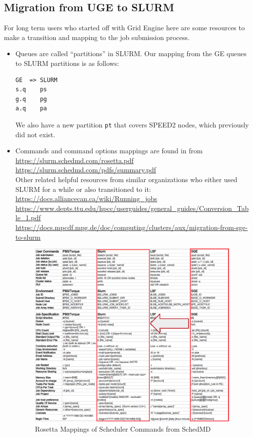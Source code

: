 \documentclass{easychair}
\begin{document}
\subsection{Migration from UGE to SLURM}
\label{appdx:uge-to-slurm}

For long term users who started off with Grid Engine here are some resources
to make a transition and mapping to the job submission process.

\begin{itemize}
\item
Queues are called ``partitions'' in SLURM. Our mapping from the GE queues
to SLURM partitions is as follows:
\begin{verbatim}
GE  => SLURM
s.q    ps
g.q    pg
a.q    pa
\end{verbatim}
We also have a new partition \texttt{pt} that covers SPEED2 nodes,
which previously did not exist.

\item
Commands and command options mappings are found in  from\\
\url{https://slurm.schedmd.com/rosetta.pdf}\\
\url{https://slurm.schedmd.com/pdfs/summary.pdf}\\
Other related helpful resources from similar organizations who either used
SLURM for a while or also transitioned to it:\\
\url{https://docs.alliancecan.ca/wiki/Running_jobs}\\
\url{https://www.depts.ttu.edu/hpcc/userguides/general_guides/Conversion_Table_1.pdf}\\
\url{https://docs.mpcdf.mpg.de/doc/computing/clusters/aux/migration-from-sge-to-slurm}

\begin{figure}[htpb]
\includegraphics[width=\columnwidth]{images/rosetta-mapping}
\caption{Rosetta Mappings of Scheduler Commands from SchedMD}
\label{fig:rosetta-mappings}
\end{figure}


\end{itemize}
\end{document}
